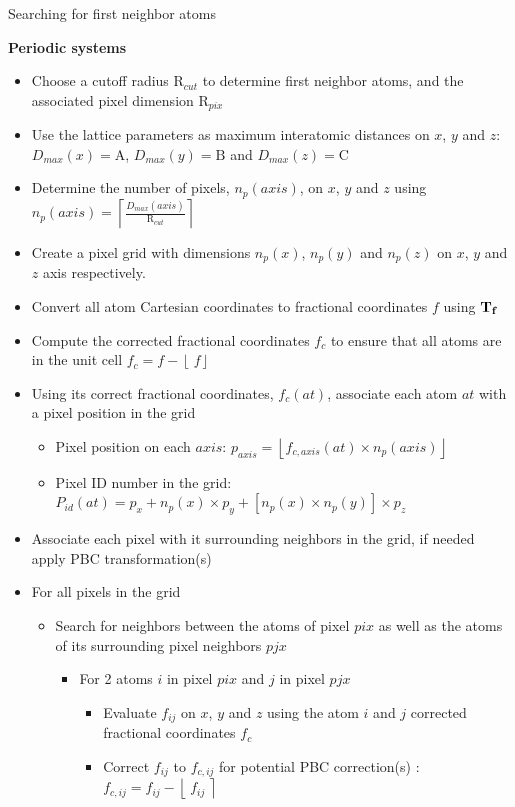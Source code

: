 \documentclass[9pt,tutorial]{livecoms}
\newcommand{\boxA}{\text{A}}
\newcommand{\boxB}{\text{B}}
\newcommand{\boxC}{\text{C}}
\newcommand{\Tf}{{\text{\bf{T}}_{\bf{f}}}}
\newcommand{\Rc}{\text{R}_{cut}}
\newcommand{\Pc}{\text{R}_{pix}}
\begin{document}
\begin{Checklists*}[h]
\begin{checklist}{Searching for first neighbor atoms}
\begin{itemize}
\begin{itemize}
\end{itemize}
\end{itemize}
\textbf{Periodic systems}
\begin{itemize}
\item Choose a cutoff radius $\Rc$ to determine first neighbor atoms, and the associated pixel dimension $\Pc$
\item Use the lattice parameters as maximum interatomic distances on $x$, $y$ and $z$: $D_{max}(x) = \boxA$, $D_{max}(y) = \boxB$ and $D_{max}(z) = \boxC$
\item Determine the number of pixels, $n_{p}(axis)$, on $x$, $y$ and $z$ using $n_{p}(axis) = \left\lceil \frac{D_{max}(axis)}{\Rc} \right\rceil$
\item Create a pixel grid with dimensions $n_{p}(x)$, $n_{p}(y)$ and $n_{p}(z)$ on $x$, $y$ and $z$ axis respectively.
\item Convert all atom Cartesian coordinates to fractional coordinates $f$ using $\Tf$
\item Compute the corrected fractional coordinates $f_c$ to ensure that all atoms are in the unit cell $f_{c} = f - \left\lfloor\ f \right\rfloor$
\item Using its correct fractional coordinates, $f_{c}(at)$, associate each atom $at$ with a pixel position in the grid
\begin{itemize}
\item Pixel position on each $axis$: $p_{axis} = \left\lfloor f_{c,axis}(at) \times n_{p}(axis) \right\rfloor$
\item Pixel ID number in the grid: $P_{id}(at) = p_{x} + n_{p}(x) \times p_{y} + \left[n_{p}(x) \times n_{p}(y)\right] \times p_{z}$
\end{itemize}
\item Associate each pixel with it surrounding neighbors in the grid, if needed apply PBC transformation(s)
\item For all pixels in the grid
\begin{itemize}
\item Search for neighbors between the atoms of pixel $pix$ as well as the atoms of its surrounding pixel neighbors $pjx$
\begin{itemize}
\item For 2 atoms $i$ in pixel $pix$ and $j$ in pixel $pjx$
\begin{itemize}
\item Evaluate $f_{ij}$ on $x$, $y$ and $z$ using the atom $i$ and $j$ corrected fractional coordinates $f_c$
\item Correct $f_{ij}$ to $f_{c,ij}$ for potential PBC correction(s) : $f_{c,ij} = f_{ij} - \left\lfloor\ f_{ij}\ \right\rceil$

\end{itemize}
\end{itemize}
\end{itemize}
\end{itemize}
\end{checklist}
\end{Checklists*}
\end{document}
